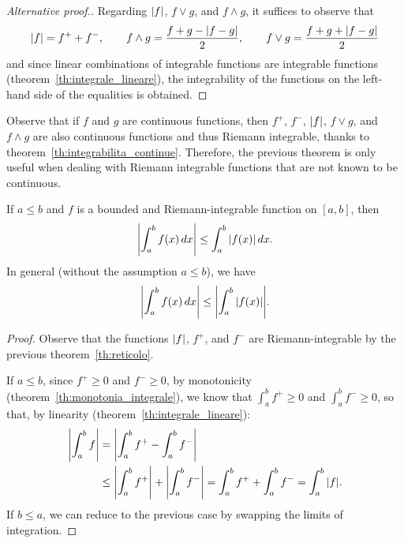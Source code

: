 \begin{proof}[Alternative proof.]
  Regarding ${\left|f\right|}$, $f\vee g$, and $f\wedge g$,  
  it suffices to observe that%
  \begin{gather*}
    {\left|f\right|} = f^+ + f^-, \qquad
    f\wedge g = \frac{f + g - {\left|f-g\right|}}{2}, \qquad
    f\vee g = \frac{f+g + {\left|f-g\right|}}{2}
  \end{gather*}
  and since linear combinations of integrable functions 
  are integrable functions (theorem~\ref{th:integrale_lineare}),
  the integrability of the functions on the left-hand side
  of the equalities is obtained.
\end{proof}

\begin{remark}
Observe that if $f$ and $g$ are continuous functions, 
then $f^+$, $f^-$, ${\left|f\right|}$, $f\vee g$, and $f\wedge g$ are also continuous
functions
and thus Riemann integrable, thanks to theorem~\ref{th:integrabilita_continue}.
Therefore, the previous theorem is only useful when dealing with 
Riemann integrable functions that are not known to be continuous. 
\end{remark}

\begin{theorem}
\label{th:integrale_modulo}%
If $a\le b$ and $f$ is a bounded and Riemann-integrable function on $[a,b]$,
then 
\[
  {\left|\int_a^b f(x)\, dx\right|} \le \int_a^b {\left|f(x)\right|}\, dx.
\]
In general (without the assumption $a \le b$), we have
\begin{equation}\label{eq:489732}
  {\left|\int_a^b f(x)\, dx\right|} 
  \le 
  {\left|\int_a^b {\left|f(x)\right|}\right|}. 
\end{equation}
\end{theorem}
\begin{proof}
Observe that the functions ${\left|f\right|}$, $f^+$, and $f^-$ are Riemann-integrable
by the previous theorem~\ref{th:reticolo}.

If $a\le b$, since $f^+\ge 0$ and $f^-\ge 0$,
by monotonicity (theorem~\ref{th:monotonia_integrale}),
we know that $\int_a^b f^+\ge 0$ 
and $\int_a^b f^-\ge 0$, so that, 
by linearity (theorem~\ref{th:integrale_lineare}):
\begin{align*}
{\left|\int_a^b f\right|} 
&= {\left|\int_a^b f^+ - \int_a^b f^-\right|}\\
&\le {\left|\int_a^b f^+\right|} + {\left|\int_a^b f^-\right|}
= \int_a^b f^+ + \int_a^b f^-
= \int_a^b {\left|f\right|}.   
\end{align*}
If $b\le a$, we can reduce to the previous case by swapping 
the limits of integration.
\end{proof}

